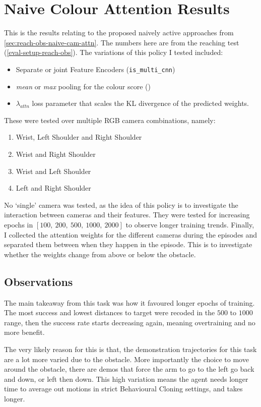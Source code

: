 \section{Naive Colour Attention Results}
This is the results relating to the proposed naively active approaches from \ref{sec:reach-obs-naive-cam-attn}. The numbers here are from the reaching test (\ref{eval-setup-reach-obs}).
The variations of this policy I tested included:
\begin{itemize}
  \item Separate or joint Feature Encoders (\verb|is_multi_cnn|)
  \item \emph{mean} or \emph{max} pooling for the colour score (\verb||)
  \item $\lambda_{attn}$ loss parameter that scales the KL divergence of the predicted 
  weights.
\end{itemize}
These were tested over multiple RGB camera combinations, namely:
\begin{enumerate}
  \item Wrist, Left Shoulder and Right Shoulder
  \item Wrist and Right Shoulder
  \item Wrist and Left Shoulder
  \item Left and Right Shoulder
\end{enumerate}
No `single' camera was tested, as the idea of this policy is to investigate the interaction between cameras and their features. They were tested for increasing epochs in \(\left[100, ~200, ~500, ~1000, ~2000\right]\) to observe longer training trends. Finally, I collected the attention weights for the different cameras during the episodes and separated them between when they happen in the episode. This is to investigate whether the weights change from above or below the obstacle.


\subsection{Observations}
The main takeaway from this task was how it favoured longer epochs of training. The most success and lowest distances to target were recoded in the $500$ to $1000$ range, then the success rate starts decreasing again, meaning overtraining and no more benefit.\todo[color=purple]{}

The very likely reason for this is that, the demonstration trajectories for this task are a lot more varied due to the obstacle. More importantly the choice to move around the obstacle, there are demos that force the arm to go to the left go back and down, or left then down. This high variation means the agent needs longer time to average out motions in strict Behavioural Cloning settings, and takes longer.


